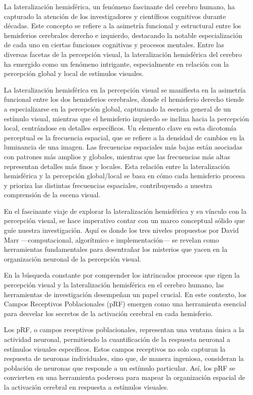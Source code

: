 \documentclass[12pt,oneside]{uhthesis}
\begin{document}
La lateralización hemisférica, un fenómeno fascinante del cerebro humano, ha capturado la atención de los investigadores y científicos cognitivos durante décadas. Este concepto se refiere a la asimetría funcional y estructural entre los hemisferios cerebrales derecho e izquierdo, destacando la notable especialización de cada uno en ciertas funciones cognitivas y procesos mentales. Entre las diversas facetas de la percepción visual, la lateralización hemisférica del cerebro ha emergido como un fenómeno intrigante, especialmente en relación con la percepción global y local de estímulos visuales.

La lateralización hemisférica en la percepción visual se manifiesta en la asimetría funcional entre los dos hemisferios cerebrales, donde el hemisferio derecho tiende a especializarse en la percepción global, capturando la esencia general de un estímulo visual, mientras que el hemisferio izquierdo se inclina hacia la percepción local, centrándose en detalles específicos. Un elemento clave en esta dicotomía perceptual es la frecuencia espacial, que se refiere a la densidad de cambios en la luminancia de una imagen. Las frecuencias espaciales más bajas están asociadas con patrones más amplios y globales, mientras que las frecuencias más altas representan detalles más finos y locales. Esta relación entre la lateralización hemisférica y la percepción global/local se basa en cómo cada hemisferio procesa y prioriza las distintas frecuencias espaciales, contribuyendo a nuestra comprensión de la escena visual.

En el fascinante viaje de explorar la lateralización hemisférica y su vínculo con la percepción visual, se hace imperativo contar con un marco conceptual sólido que guíe nuestra investigación. Aquí es donde los tres niveles propuestos por David Marr —computacional, algorítmico e implementación— se revelan como herramientas fundamentales para desentrañar los misterios que yacen en la organización neuronal de la percepción visual.

En la búsqueda constante por comprender los intrincados procesos que rigen la percepción visual y la lateralización hemisférica en el cerebro humano, las herramientas de investigación desempeñan un papel crucial. En este contexto, los Campos Receptivos Poblacionales (pRF) emergen como una herramienta esencial para desvelar los secretos de la activación cerebral en cada hemisferio.

Los pRF, o campos receptivos poblacionales, representan una ventana única a la actividad neuronal, permitiendo la cuantificación de la respuesta neuronal a estímulos visuales específicos. Estos campos receptivos no solo capturan la respuesta de neuronas individuales, sino que, de manera ingeniosa, consideran la población de neuronas que responde a un estímulo particular. Así, los pRF se convierten en una herramienta poderosa para mapear la organización espacial de la activación cerebral en respuesta a estímulos visuales.
\end{document}
